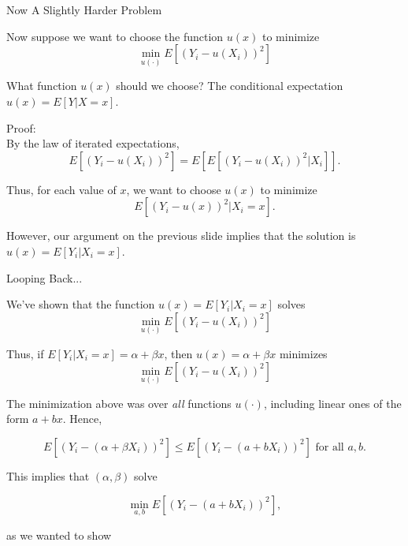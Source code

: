 \documentclass[11pt,english,handout]{beamer}
\newenvironment{wideitemize}{\itemize\addtolength{\itemsep}{10pt}}{\enditemize}
\begin{document}
\begin{frame}{Now A Slightly Harder Problem}
\vspace{0.2cm}
\begin{wideitemize}

	\item
	Now suppose we want to choose the function $u(x)$ to minimize
	$$\min_{u(\cdot)} E[ (Y_i - u(X_i))^2  ]$$
	
	\pause
	\item
	What function $u(x)$ should we choose? \pause The conditional expectation $u(x) = E[Y|X= x]$. 
	
	\pause
	\item
	Proof: \\
	By the law of iterated expectations,
	$$E[ (Y_i - u(X_i))^2  ] = E[  E[  (Y_i - u(X_i)) ^2| X_i  ]   ] .$$
	
	\pause
	Thus, for each value of $x$, we want to choose $u(x)$ to minimize
	$$E[ (Y_i - u(x))^2 | X_i = x ].$$ 
	
	\pause However, our argument on the previous slide implies that the solution is $u(x) = E[Y_i | X_i = x]$. 
\end{wideitemize}
\end{frame}

\begin{frame}{Looping Back...}
	
\begin{wideitemize}

\item
We've shown that the function $u(x) = E[Y_i | X_i = x]$ solves
$$\min_{u(\cdot)} E[ (Y_i - u(X_i))^2  ]$$

\pause
\item
Thus, if $E[Y_i | X_i = x] = \alpha + \beta x$, then $u(x) = \alpha + \beta x$ minimizes  
$$\min_{u(\cdot)} E[ (Y_i - u(X_i))^2  ]$$

\pause
\item
The minimization above was over \textit{all} functions $u(\cdot)$, including linear ones of the form $a + b x$. Hence, 

$$ E[ (Y_i -  (\alpha + \beta X_i)  )^2  ] \leq  E[ (Y_i -  (a + b X_i)  )^2  ]  \text{ for all } a ,b. $$

\pause
\item
This implies that $(\alpha,\beta)$ solve

$$\min_{a,b}E[ (Y_i -  (a+ b X_i)  )^2  ] ,$$

\noindent as we wanted to show
\end{wideitemize}	
\end{frame}
\end{document}

